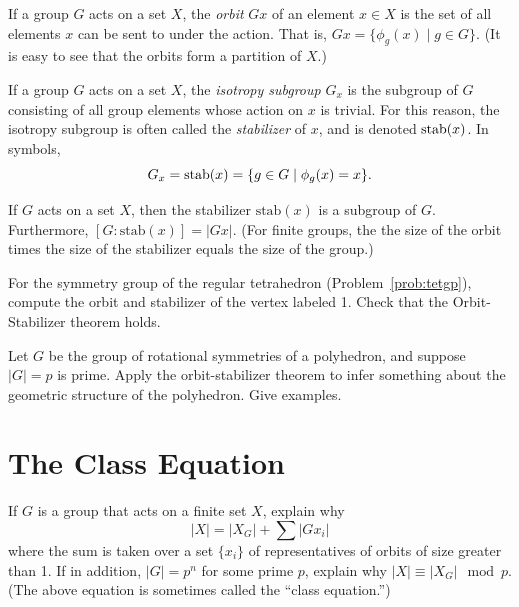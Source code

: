 \begin{definition}
 If a group $G$ acts on a set $X$, the \emph{orbit} $Gx$ of an element $x \in X$ is the set of all elements $x$ can be sent to under the action.  That is, $Gx = \{ \phi_g(x) \mid g \in G \}$.  (It is easy to see that the orbits form a partition of $X$.)
\end{definition}

\begin{definition}
 If a group $G$ acts on a set $X$, the \emph{isotropy subgroup} $G_x$ is the subgroup of $G$ consisting of all group elements whose action on $x$ is trivial.  For this reason, the isotropy subgroup is often called the \emph{stabilizer} of $x$, and is denoted $\operatorname{stab}(x)$.  In symbols,
 $$G_x = \operatorname{stab}(x) = \{ g \in G \mid \phi_g(x) = x \}.$$
\end{definition}

\begin{theorem}
 If $G$ acts on a set $X$, then the stabilizer $\mbox{stab}(x)$ is a subgroup of $G$. Furthermore, $[G:\mbox{stab}(x)] = \lvert Gx \rvert$. (For finite groups, the the size of the orbit times the size of the stabilizer equals the size of the group.)
\end{theorem}

\begin{problem}
For the symmetry group of the regular tetrahedron (Problem~\ref{prob:tetgp}), compute the orbit and stabilizer of the vertex labeled 1. Check that the Orbit-Stabilizer theorem holds.
\end{problem}



\begin{problem}
Let $G$ be the group of rotational symmetries of a polyhedron, and suppose $\lvert G \rvert = p$ is prime.  Apply the orbit-stabilizer theorem to infer something about the geometric structure of the polyhedron.  Give examples.
\end{problem}

\section{The Class Equation}

\begin{problem}
If $G$ is a group that acts on a finite set $X$, explain why
$$\lvert X \rvert = \lvert X_G \rvert + \sum \lvert G{x_i}\rvert$$
where the sum is taken over a set $\{x_i\}$ of representatives of orbits of size greater than 1.  If in addition, $\lvert G \rvert=p^n$ for some prime $p$, explain why $\lvert X \rvert \equiv \lvert X_G \rvert \mod p$. (The above equation is sometimes called the ``class equation.'')
\end{problem}



